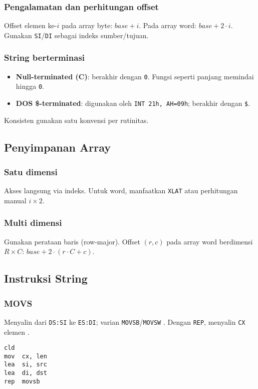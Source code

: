 \subsubsection{Pengalamatan dan perhitungan offset}
Offset elemen ke-\(i\) pada array byte: \(base + i\). Pada array word: \(base + 2\cdot i\). Gunakan \texttt{SI}/\texttt{DI} sebagai indeks sumber/tujuan.

\subsubsection{String berterminasi}
\begin{itemize}
  \item \textbf{Null-terminated (C)}: berakhir dengan \texttt{0}. Fungsi seperti panjang memindai hingga \texttt{0}.
  \item \textbf{DOS \$-terminated}: digunakan oleh \texttt{INT 21h, AH=09h}; berakhir dengan \texttt{\$}.
\end{itemize}
Konsisten gunakan satu konvensi per rutinitas.

\subsection{Penyimpanan Array}
\subsubsection{Satu dimensi}
Akses langsung via indeks. Untuk word, manfaatkan \texttt{XLAT} atau perhitungan manual \(i\times 2\).

\subsubsection{Multi dimensi}
Gunakan perataan baris (row-major). Offset \((r,c)\) pada array word berdimensi \(R\times C\): \(base + 2\cdot (r\cdot C + c)\).

\subsection{Instruksi String}
\subsubsection{MOVS}
Menyalin dari \texttt{DS:SI} ke \texttt{ES:DI}; varian \texttt{MOVSB}/\texttt{MOVSW} \cite{hyde2010art}. Dengan \texttt{REP}, menyalin \texttt{CX} elemen \cite{susanto1995belajar}.
\begin{verbatim}
cld
mov  cx, len
lea  si, src
lea  di, dst
rep  movsb
\end{verbatim}

